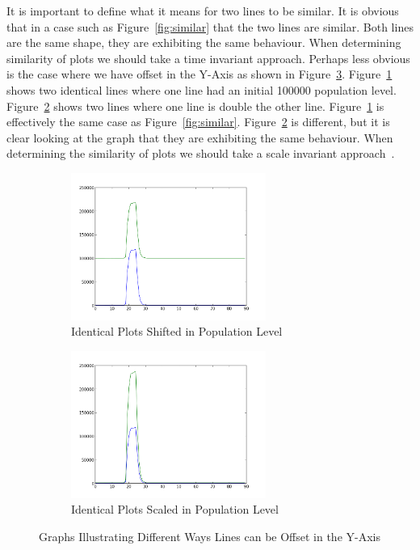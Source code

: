 It is important to define what it means for two lines to be similar.  It is obvious that in a case such as Figure~\ref{fig:similar} that the two lines are similar.  Both lines are the same shape, they are exhibiting the same behaviour.  When determining similarity of plots we should take a time invariant approach.  Perhaps less obvious is the case where we have offset in the Y-Axis as shown in Figure~\ref{fig:similar_y}.  Figure~\ref{fig:similar_1} shows two identical lines where one line had an initial 100000 population level.  Figure~\ref{fig:similar_2} shows two lines where one line is double the other line.  Figure~\ref{fig:similar_1} is effectively the same case as Figure~\ref{fig:similar}.  Figure~\ref{fig:similar_2} is different, but it is clear looking at the graph that they are exhibiting the same behaviour. When determining the similarity of plots we should take a scale invariant approach~\cite{esling}.

\begin{figure}[h!]
    \centering
    \begin{subfigure}[b]{0.6\textwidth}
        \centering
        \includegraphics[width=0.7\textwidth]{images/similar_plots_2.png}
        \caption{Identical Plots Shifted in Population Level}
        \label{fig:similar_1}
    \end{subfigure}

    \begin{subfigure}[b]{0.6\textwidth}
        \centering
        \includegraphics[width=0.7\textwidth]{images/similar_plots_3.png}
        \caption{Identical Plots Scaled in Population Level}
        \label{fig:similar_2}
    \end{subfigure}
    \caption{Graphs Illustrating Different Ways Lines can be Offset in the Y-Axis}
    \label{fig:similar_y}
\end{figure}

